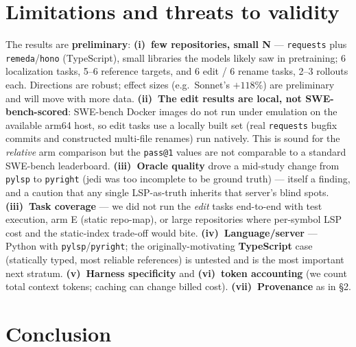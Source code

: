 \documentclass[11pt]{article}
\newcommand{\code}[1]{\texttt{#1}}
\begin{document}
\section{Limitations and threats to validity}\label{sec:limits}

The results are \textbf{preliminary}: \textbf{(i)~few repositories, small N} ---
\code{requests} plus \code{remeda}/\code{hono} (TypeScript), small libraries the models likely saw in
pretraining; 6 localization tasks, 5--6 reference targets, and 6 edit / 6 rename tasks, 2--3 rollouts each.
Directions are robust; effect sizes (e.g.\ Sonnet's $+118\%$) are preliminary and will move with more data.
\textbf{(ii)~The edit results are local, not SWE-bench-scored}: SWE-bench Docker images do not run under
emulation on the available arm64 host, so edit tasks use a locally built set (real \code{requests} bugfix
commits and constructed multi-file renames) run natively. This is sound for the \emph{relative} arm
comparison but the \code{pass@1} values are not comparable to a standard SWE-bench leaderboard.
\textbf{(iii)~Oracle quality} drove a mid-study change from
\code{pylsp} to \code{pyright} (jedi was too incomplete to be ground truth) --- itself a finding, and a
caution that any single LSP-as-truth inherits that server's blind spots. \textbf{(iii)~Task coverage}
--- we did not run the \emph{edit} tasks end-to-end with test execution, arm E (static repo-map), or
large repositories where per-symbol LSP cost and the static-index trade-off would bite.
\textbf{(iv)~Language/server} --- Python with \code{pylsp}/\code{pyright}; the originally-motivating
\textbf{TypeScript} case (statically typed, most reliable references) is untested and is the most
important next stratum. \textbf{(v)~Harness specificity} and \textbf{(vi)~token accounting} (we count
total context tokens; caching can change billed cost). \textbf{(vii)~Provenance} as in \S2.

\section{Conclusion}
\end{document}
